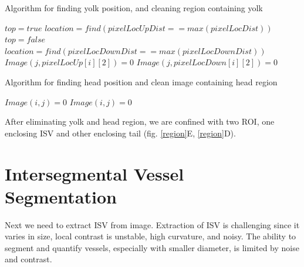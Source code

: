 \begin{algorithm}
  \caption{Algorithm for finding yolk position, and cleaning region containing yolk }
  \begin{algorithmic}
    \State $top =  true$
    \State $location =  find(pixelLocUpDist == max(pixelLocDist))$
 \Else
   \State $top =  false$
   \State $location =  find(pixelLocDownDist == max(pixelLocDownDist))$
\EndIf 
{}
			\State $Image(j, pixelLocUp[i][2]) = 0$
		\EndFor
	\EndFor
{}
\Else
			\State $Image(j, pixelLocDown[i][2]) = 0$
		\EndFor
	\EndFor
\EndIf
\end{algorithmic}
\label{alg:yolkLocation}
\end{algorithm}

\begin{algorithm}
  \caption{Algorithm for finding head position and clean image containing head region}
  \begin{algorithmic}
			\State $Image(i,j) = 0$
		\EndFor
		\EndFor	
{}
\Else 
			\State $Image(i,j) = 0$
	 \EndFor
	\EndFor
\EndIf
\end{algorithmic}
\label{alg:headLocation}
\end{algorithm}

After eliminating yolk and head region, we are confined with two ROI, one enclosing ISV and other enclosing tail (fig. \ref{region}E, \ref{region}D).

\section{Intersegmental Vessel Segmentation}\label{sec:isvseg}

Next we need to extract ISV from image. Extraction of ISV is challenging since it varies in size, local contrast is unstable, high curvature, and noisy. The ability to segment and quantify vessels, especially with smaller diameter, is limited by noise and contrast. 


